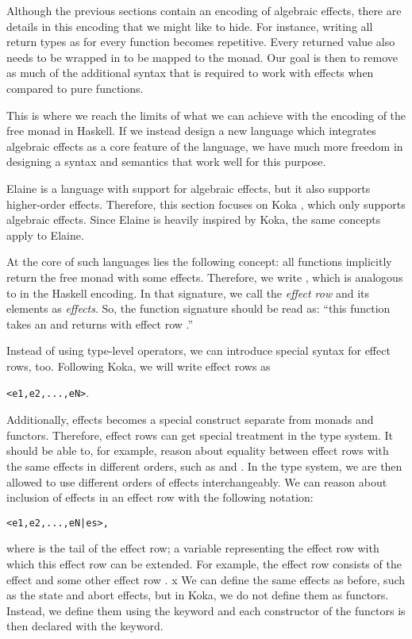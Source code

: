 Although the previous sections contain an encoding of algebraic effects, there are details in this encoding that we might like to hide. For instance, writing all return types as  for every function becomes repetitive. Every returned value also needs to be wrapped in  to be mapped to the monad. Our goal is then to remove as much of the additional syntax that is required to work with effects when compared to pure functions.

This is where we reach the limits of what we can achieve with the encoding of the free monad in Haskell. If we instead design a new language which integrates algebraic effects as a core feature of the language, we have much more freedom in designing a syntax and semantics that work well for this purpose.

Elaine is a language with support for algebraic effects, but it also supports higher-order effects. Therefore, this section focuses on Koka \autocite{leijen_koka_2014,leijen_koka_2023}, which only supports algebraic effects. Since Elaine is heavily inspired by Koka, the same concepts apply to Elaine.

At the core of such languages lies the following concept: all functions implicitly return the free monad with some effects. Therefore, we write , which is analogous to  in the Haskell encoding. In that signature, we call  the \emph{effect row} and its elements as \emph{effects}. So, the function signature  should be read as: ``this function takes an  and returns  with effect row .''

Instead of using type-level operators, we can introduce special syntax for effect rows, too. Following Koka, we will write effect rows as
\begin{center}\texttt{<e1,e2,...,eN>}.\end{center}
Additionally, effects becomes a special construct separate from monads and functors. Therefore, effect rows can get special treatment in the type system. It should be able to, for example, reason about equality between effect rows with the same effects in different orders, such as  and . In the type system, we are then allowed to use different orders of effects interchangeably. We can reason about inclusion of effects in an effect row with the following notation:
\begin{center}\texttt{<e1,e2,...,eN|es>,}\end{center}
where  is the tail of the effect row; a variable representing the effect row with which this effect row can be extended. For example, the effect row  consists of the  effect and some other effect row . 
x
We can define the same effects as before, such as the state and abort effects, but in Koka, we do not define them as functors. Instead, we define them using the  keyword and each constructor of the functors is then declared with the  keyword.

